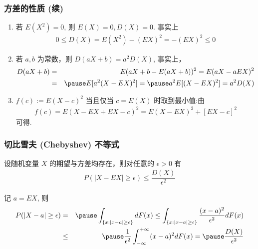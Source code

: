 \documentclass[Prob-All.tex]{subfiles}
\begin{document}
	\begin{frame}
		\frametitle{方差的性质 (续)}
		\begin{enumerate}[<+-|alert@+>]
			\item[4.] 若 $E (X^2)=0$, 则 $E (X)=0, D (X)=0$. \pause 事实上
			\begin{eqnarray*}
				0\le D(X)=E(X^2)-(EX)^2=-(EX)^2\le 0
			\end{eqnarray*}

			\item[5.] 若 $a,b$ 为常数，则 $D (aX+b)=a^2D (X)$, \pause 事实上，
			\begin{eqnarray*}
				D(aX+b)&=&E(aX+b-E(aX+b))^2=E(aX-aEX)^2
				\\ &=&\pause E[a^2(X-EX)^2]=\pause a^2E[(X-EX)^2]=a^2D(X)    \end{eqnarray*}
			\item[6.] $f (c):=E (X-c)^2$ 当且仅当 $c=E (X)$ 时取到最小值:\pause 由
			\begin{eqnarray*}
				f(c)=E(X-EX+EX-c)^2=E(X-EX)^2+[EX-c]^2
			\end{eqnarray*}
			可得.
		\end{enumerate}
	\end{frame}


	\begin{frame}
		\frametitle{切比雪夫 (Chebyshev) 不等式}
		\begin{thm}
			设随机变量 $X$ 的期望与方差均存在，则对任意的 $\epsilon>0$ 有
			\begin{eqnarray*}
				P(|X-EX|\ge \epsilon)\le \dfrac{D(X)}{\epsilon^2}
			\end{eqnarray*}
		\end{thm}


		\pause \zheng 记 $a=EX$, 则
		\begin{eqnarray*}
			P(|X-a|\ge \epsilon)&=&\pause\int_{\{x:|x-a|\ge \epsilon\}}dF(x)\le \int_{\{x:|x-a|\ge \epsilon\}}\dfrac{(x-a)^2}{\epsilon^2}dF(x)\\
			&\le&\pause \dfrac{1}{\epsilon^2}\int_{-\infty}^{+\infty}(x-a)^2dF(x)=\pause \dfrac{D(X)}{\epsilon^2}
		\end{eqnarray*}

	\end{frame}
\end{document}
